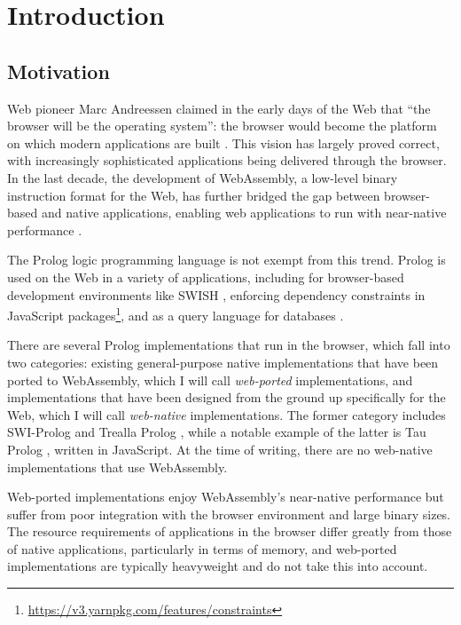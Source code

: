 \chapter{Introduction}


\section{Motivation}

Web pioneer Marc Andreessen claimed in the early days of the Web that ``the browser will be the operating system'': the browser would become the platform on which modern applications are built \cite{kosnerAlwaysEarlyMarc2012}. This vision has largely proved correct, with increasingly sophisticated applications being delivered through the browser. In the last decade, the development of WebAssembly, a low-level binary instruction format for the Web, has further bridged the gap between browser-based and native applications, enabling web applications to run with near-native performance \cite{haasBringingwebspeed2017}.

The Prolog logic programming language is not exempt from this trend. Prolog is used on the Web in a variety of applications, including for browser-based development environments like SWISH \cite{wielemakerSWISHSWIPrologSharing2015}, enforcing dependency constraints in JavaScript packages\footnote{\url{https://v3.yarnpkg.com/features/constraints}}, and as a query language for databases \cite{wielemakerUsingPrologFundament2007}.

There are several Prolog implementations that run in the browser, which fall into two categories: existing general-purpose native implementations that have been ported to WebAssembly, which I will call \emph{web-ported} implementations, and implementations that have been designed from the ground up specifically for the Web, which I will call \emph{web-native} implementations. The former category includes SWI-Prolog \cite{wielemakerSWIProlog2012} and Trealla Prolog \cite{davisonTreallaProlog2020}, while a notable example of the latter is Tau Prolog \cite{riazaTauPrologProlog2024}, written in JavaScript. At the time of writing, there are no web-native implementations that use WebAssembly.

Web-ported implementations enjoy WebAssembly's near-native performance but suffer from poor integration with the browser environment and large binary sizes. The resource requirements of applications in the browser differ greatly from those of native applications, particularly in terms of memory, and web-ported implementations are typically heavyweight and do not take this into account.

